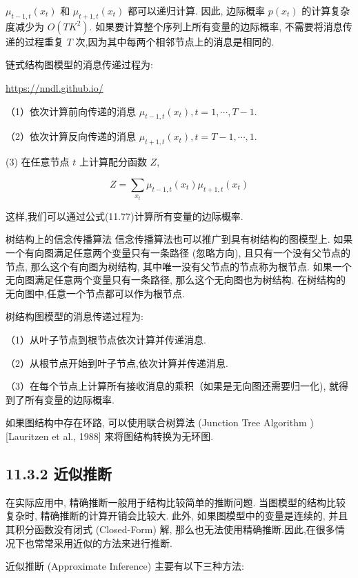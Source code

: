 \documentclass[10pt]{article}
\begin{document}
$\mu_{t-1, t}\left(x_{t}\right)$ 和 $\mu_{t+1, t}\left(x_{t}\right)$ 都可以递归计算. 因此, 边际概率 $p\left(x_{t}\right)$ 的计算复杂度减少为 $O\left(T K^{2}\right)$. 如果要计算整个序列上所有变量的边际概率, 不需要将消息传递的过程重复 $T$ 次,因为其中每两个相邻节点上的消息是相同的.

链式结构图模型的消息传递过程为:

\href{https://nndl.github.io/}{https://nndl.github.io/}

（1）依次计算前向传递的消息 $\mu_{t-1, t}\left(x_{t}\right), t=1, \cdots, T-1$.

（2）依次计算反向传递的消息 $\mu_{t+1, t}\left(x_{t}\right), t=T-1, \cdots, 1$.

(3) 在任意节点 $t$ 上计算配分函数 $Z$,


\begin{equation*}
Z=\sum_{x_{t}} \mu_{t-1, t}\left(x_{t}\right) \mu_{t+1, t}\left(x_{t}\right) \tag{11.80}
\end{equation*}


这样,我们可以通过公式(11.77)计算所有变量的边际概率.

树结构上的信念传播算法 信念传播算法也可以推广到具有树结构的图模型上. 如果一个有向图满足任意两个变量只有一条路径 (忽略方向), 且只有一个没有父节点的节点, 那么这个有向图为树结构, 其中唯一没有父节点的节点称为根节点. 如果一个无向图满足任意两个变量只有一条路径, 那么这个无向图也为树结构. 在树结构的无向图中,任意一个节点都可以作为根节点.

树结构图模型的消息传递过程为:

（1）从叶子节点到根节点依次计算并传递消息.

（2）从根节点开始到叶子节点,依次计算并传递消息.

（3）在每个节点上计算所有接收消息的乘积（如果是无向图还需要归一化), 就得到了所有变量的边际概率.

如果图结构中存在环路, 可以使用联合树算法 (Junction Tree Algorithm ) [Lauritzen et al., 1988] 来将图结构转换为无环图.

\subsection*{11.3.2 近似推断}
在实际应用中, 精确推断一般用于结构比较简单的推断问题. 当图模型的结构比较复杂时, 精确推断的计算开销会比较大. 此外, 如果图模型中的变量是连续的, 并且其积分函数没有闭式 (Closed-Form) 解, 那么也无法使用精确推断.因此,在很多情况下也常常采用近似的方法来进行推断.

近似推断 (Approximate Inference) 主要有以下三种方法:
\end{document}
